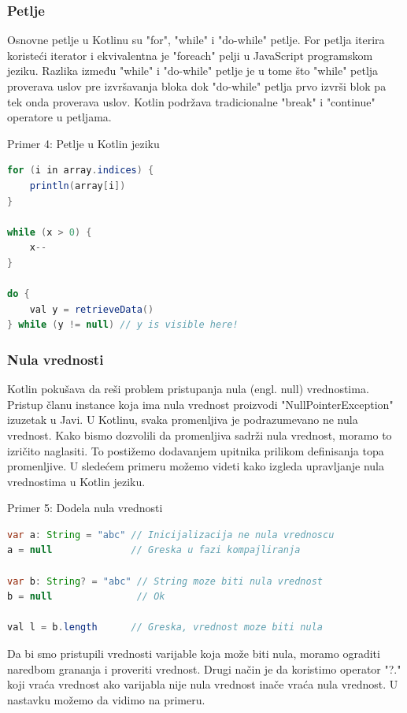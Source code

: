 \documentclass[12pt,oneside]{memoir}
\begin{document}
 
\subsubsection{Petlje}
Osnovne petlje u Kotlinu su "for", "while" i "do-while" petlje. For petlja iterira koristeći iterator i ekvivalentna je "foreach" pelji u JavaScript programskom jeziku. Razlika između "while" i "do-while" petlje je u tome što "while" petlja proverava uslov pre izvršavanja bloka dok "do-while" petlja prvo izvrši blok pa tek onda proverava uslov. Kotlin podržava tradicionalne "break" i "continue" operatore u petljama.

\begin{center} Primer 4: Petlje u Kotlin jeziku\end{center}
\begin{lstlisting}[language=Java]
for (i in array.indices) {
    println(array[i])
}
 
while (x > 0) {
    x--
}
 
do {
    val y = retrieveData()
} while (y != null) // y is visible here!
\end{lstlisting}
 
\subsubsection{Nula vrednosti}
Kotlin pokušava da reši problem pristupanja nula (engl. null) vrednostima. Pristup članu instance koja ima nula vrednost proizvodi "NullPointerException" izuzetak u Javi. U Kotlinu, svaka promenljiva je podrazumevano ne nula vrednost. Kako bismo dozvolili da promenljiva sadrži nula vrednost, moramo to izričito naglasiti. To postižemo dodavanjem upitnika prilikom definisanja topa promenljive. U sledećem primeru možemo videti kako izgleda upravljanje nula vrednostima u Kotlin jeziku.

\begin{center} Primer 5: Dodela nula vrednosti\end{center}
\begin{lstlisting}[language=Java]
var a: String = "abc" // Inicijalizacija ne nula vrednoscu
a = null              // Greska u fazi kompajliranja
 
var b: String? = "abc" // String moze biti nula vrednost
b = null               // Ok
 
val l = b.length      // Greska, vrednost moze biti nula
\end{lstlisting}
 
Da bi smo pristupili vrednosti varijable koja može biti nula, moramo ograditi naredbom grananja i proveriti vrednost. Drugi način je da koristimo operator "?." koji vraća vrednost ako varijabla nije nula vrednost inače vraća nula vrednost. U nastavku možemo da vidimo na primeru.
 
\end{document}
